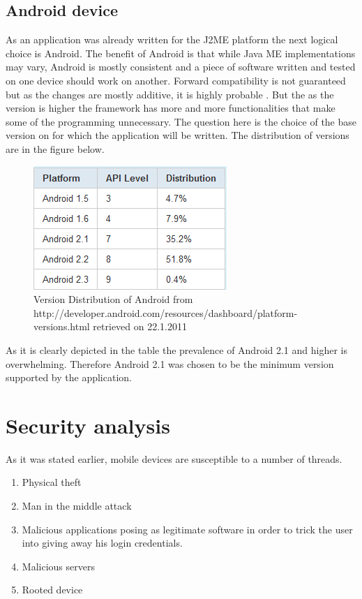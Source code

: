 \documentclass[11pt,twoside,a4paper]{book}
\begin{document}
\subsection{Android device}
 As an application was already written for the J2ME platform the next logical choice is Android. The benefit of Android\cite{whatisAnd} is that while Java ME implementations may vary, Android is mostly consistent and a piece of software written and tested on one device should work on another. Forward compatibility is not guaranteed but as the changes are mostly additive, it is highly probable \cite{goodevpi}. But the as the version is higher the framework has more and more functionalities that make some of the programming unnecessary. The question here is the choice of the base version on for which the application will be written. The distribution of versions are in the figure below.




\begin{figure}[h]
\begin{center}
\includegraphics[scale=1]{figures/VersionDistribution.PNG} 
\caption{Version Distribution of Android \cite{goodevver} from http://developer.android.com/resources/dashboard/platform-versions.html retrieved on 22.1.2011  }
\label{fig:versions}
\end{center}
\end{figure}


As it is clearly depicted in the table the prevalence of Android 2.1 and higher is overwhelming. Therefore Android 2.1 was chosen to be the minimum version supported by the application.
 	


\section{Security analysis}
\label{sec:security}

As it was stated earlier, mobile devices are susceptible to a number of threads. 
\begin{enumerate}
\item Physical theft
\item Man in the middle attack
\item Malicious applications posing as legitimate software in order to trick the user into giving away his login credentials.
\item Malicious servers %
\item Rooted device
\end{enumerate}
\end{document}
